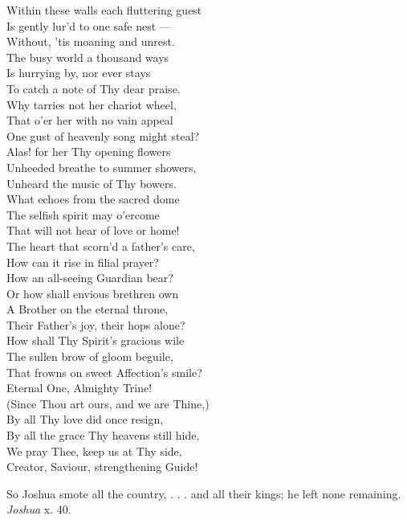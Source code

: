   Within these walls each fluttering guest \\
 Is gently lur’d to one safe nest — \\
 Without, ’tis moaning and unrest. \\
  The busy world a thousand ways \\
 Is hurrying by, nor ever stays \\
 To catch a note of Thy dear praise. \\
  Why tarries not her chariot wheel, \\
 That o’er her with no vain appeal \\
 One gust of heavenly song might steal? \\
  Alas! for her Thy opening flowers \\
 Unheeded breathe to summer showers, \\
 Unheard the music of Thy bowers. \\
  What echoes from the sacred dome \\
 The selfish spirit may o’ercome \\
 That will not hear of love or home! \\
  The heart that scorn’d a father’s care, \\
 How can it rise in filial prayer? \\
 How an all-seeing Guardian bear? \\
  Or how shall envious brethren own \\
 A Brother on the eternal throne, \\
 Their Father’s joy, their hops alone? \\
  How shall Thy Spirit’s gracious wile \\
 The sullen brow of gloom beguile, \\
 That frowns on sweet Affection’s smile? \\
  Eternal One, Almighty Trine! \\
 (Since Thou art ours, and we are Thine,) \\
 By all Thy love did once resign, \\
  By all the grace Thy heavens still hide, \\
 We pray Thee, keep us at Thy side, \\
 Creator, Saviour, strengthening Guide!\\


So Joshua smote all the country, . . . and all their kings; he left none remaining. \emph{Joshua} x. 40.

